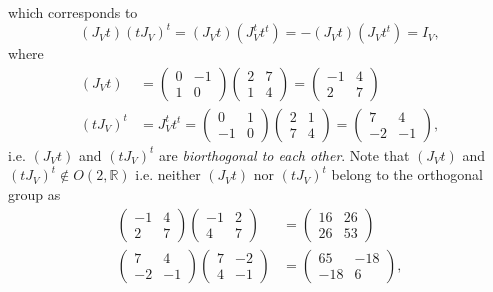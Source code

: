 \documentclass[aps,preprint]{revtex4}
\begin{document}
which corresponds to%
\begin{equation}
\left( J_{V}t\right) \left( tJ_{V}\right) ^{t}=\left( J_{V}t\right) \left(
J_{V}^{t}t^{t}\right) =-\left( J_{V}t\right) \left( J_{V}t^{t}\right) =I_{V},
\end{equation}%
where%
\begin{align}
\left( J_{V}t\right) & =\left( 
\begin{array}{cc}
0 & -1 \\ 
1 & 0%
\end{array}%
\right) \left( 
\begin{array}{cc}
2 & 7 \\ 
1 & 4%
\end{array}%
\right) =\left( 
\begin{array}{cc}
-1 & 4 \\ 
2 & 7%
\end{array}%
\right) \\
\left( tJ_{V}\right) ^{t}& =J_{V}^{t}t^{t}=\left( 
\begin{array}{cc}
0 & 1 \\ 
-1 & 0%
\end{array}%
\right) \left( 
\begin{array}{cc}
2 & 1 \\ 
7 & 4%
\end{array}%
\right) =\left( 
\begin{array}{cc}
7 & 4 \\ 
-2 & -1%
\end{array}%
\right) ,
\end{align}%
i.e. $\left( J_{V}t\right) $ and $\left( tJ_{V}\right) ^{t}$ are \emph{%
biorthogonal to each other}. Note that $\left( J_{V}t\right) $ and $\left(
tJ_{V}\right) ^{t}\notin O\left( 2,\mathbb{R}\right) $ i.e. neither $\left(
J_{V}t\right) $ nor $\left( tJ_{V}\right) ^{t}$ belong to the orthogonal
group as 
\begin{align}
\left( 
\begin{array}{cc}
-1 & 4 \\ 
2 & 7%
\end{array}%
\right) \left( 
\begin{array}{cc}
-1 & 2 \\ 
4 & 7%
\end{array}%
\right) & =\left( 
\begin{array}{cc}
16 & 26 \\ 
26 & 53%
\end{array}%
\right) \\
\left( 
\begin{array}{cc}
7 & 4 \\ 
-2 & -1%
\end{array}%
\right) \left( 
\begin{array}{cc}
7 & -2 \\ 
4 & -1%
\end{array}%
\right) & =\left( 
\begin{array}{cc}
65 & -18 \\ 
-18 & 6%
\end{array}%
\right) ,
\end{align}%
\end{document}
